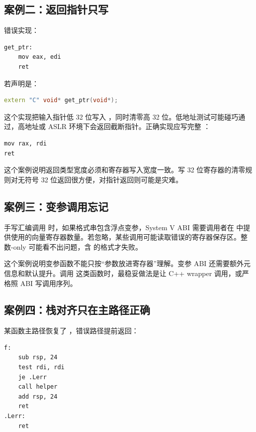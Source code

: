 \subsection{案例二：返回指针只写 }

错误实现：

\begin{lstlisting}
get_ptr:
    mov eax, edi
    ret
\end{lstlisting}

若声明是：

\begin{lstlisting}[language=C++]
extern "C" void* get_ptr(void*);
\end{lstlisting}

这个实现把输入指针低 32 位写入 ，同时清零高 32 位。低地址测试可能碰巧通过，高地址或 ASLR 环境下会返回截断指针。正确实现应写完整 ：

\begin{lstlisting}
mov rax, rdi
ret
\end{lstlisting}

这个案例说明返回类型宽度必须和寄存器写入宽度一致。写 32 位寄存器的清零规则对无符号 32 位返回很方便，对指针返回则可能是灾难。

\subsection{案例三：变参调用忘记 }

手写汇编调用  时，如果格式串包含浮点变参，System V ABI 需要调用者在  中提供使用的向量寄存器数量。若忽略，某些调用可能读取错误的寄存器保存区。整数-only  可能看不出问题，含  的格式才失败。

这个案例说明变参函数不能只按“参数放进寄存器”理解。变参 ABI 还需要额外元信息和默认提升。调用  这类函数时，最稳妥做法是让 C++ wrapper 调用，或严格照 ABI 写调用序列。

\subsection{案例四：栈对齐只在主路径正确}

某函数主路径恢复了 ，错误路径提前返回：

\begin{lstlisting}
f:
    sub rsp, 24
    test rdi, rdi
    je .Lerr
    call helper
    add rsp, 24
    ret
.Lerr:
    ret
\end{lstlisting}

